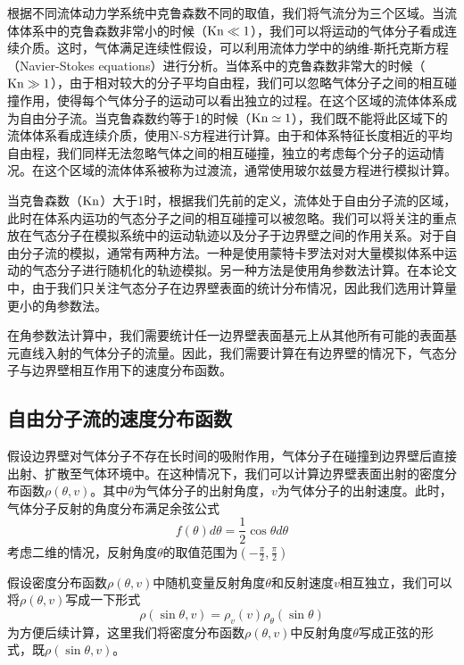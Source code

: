     根据不同流体动力学系统中克鲁森数不同的取值，我们将气流分为三个区域。当流体体系中的克鲁森数非常小的时候（${\rm Kn}\ll 1$），我们可以将运动的气体分子看成连续介质。这时，气体满足连续性假设，可以利用流体力学中的纳维-斯托克斯方程（Navier-Stokes equations）进行分析。当体系中的克鲁森数非常大的时候（${\rm Kn}\gg 1$），由于相对较大的分子平均自由程，我们可以忽略气体分子之间的相互碰撞作用，使得每个气体分子的运动可以看出独立的过程。在这个区域的流体体系成为自由分子流。当克鲁森数约等于1的时候（${\rm Kn}\simeq 1$），我们既不能将此区域下的流体体系看成连续介质，使用N-S方程进行计算。由于和体系特征长度相近的平均自由程，我们同样无法忽略气体之间的相互碰撞，独立的考虑每个分子的运动情况。在这个区域的流体体系被称为过渡流，通常使用玻尔兹曼方程进行模拟计算。

    当克鲁森数（${\rm Kn}$）大于1时，根据我们先前的定义，流体处于自由分子流的区域，此时在体系内运功的气态分子之间的相互碰撞可以被忽略。我们可以将关注的重点放在气态分子在模拟系统中的运动轨迹以及分子于边界壁之间的作用关系。对于自由分子流的模拟，通常有两种方法。一种是使用蒙特卡罗法对对大量模拟体系中运动的气态分子进行随机化的轨迹模拟。另一种方法是使用角参数法计算。在本论文中，由于我们只关注气态分子在边界壁表面的统计分布情况，因此我们选用计算量更小的角参数法。

    在角参数法计算中，我们需要统计任一边界壁表面基元上从其他所有可能的表面基元直线入射的气体分子的流量。因此，我们需要计算在有边界壁的情况下，气态分子与边界壁相互作用下的速度分布函数。
    
    \subsection{自由分子流的速度分布函数}

    假设边界壁对气体分子不存在长时间的吸附作用，气体分子在碰撞到边界壁后直接出射、扩散至气体环境中。在这种情况下，我们可以计算边界壁表面出射的密度分布函数$\rho\left(\theta, v\right)$。其中$\theta$为气体分子的出射角度，$v$为气体分子的出射速度。此时，气体分子反射的角度分布满足余弦公式\chinesecolon
    \begin{equation}
        f\left(\theta\right)d\theta =\frac{1}{2}\cos\theta d\theta 
    \end{equation}    
    考虑二维的情况，反射角度$\theta$的取值范围为$\left(-\frac{\pi}{2},\frac{\pi}{2}\right)$

    假设密度分布函数$\rho\left(\theta, v\right)$中随机变量反射角度$\theta$和反射速度$v$相互独立，我们可以将$\rho\left(\theta, v\right)$写成一下形式\chinesecolon
    \[
        \rho\left(\sin\theta,v\right)=\rho_v\left(v\right)\rho_\theta\left(\sin\theta\right)
    \]
    为方便后续计算，这里我们将密度分布函数$\rho\left(\theta, v\right)$中反射角度$\theta$写成正弦的形式，既$\rho(\sin\theta,v)$。


